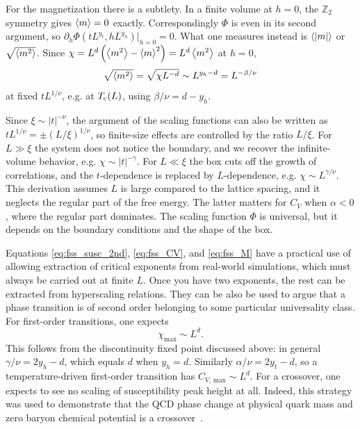 For the magnetization there is a subtlety. In a finite volume at $h=0$, the
$\mathbb{Z}_2$ symmetry gives $\ev{m}=0$ exactly. Correspondingly $\Phi$ is even
in its second argument, so
$\partial_h\Phi\left(tL^{y_t},hL^{y_h}\right)\big|_{h=0}=0$. What one measures
instead is $\ev{|m|}$ or $\sqrt{\ev{m^2}}$. Since
$\chi=L^d\left(\ev{m^2}-\ev{m}^2\right)=L^d\ev{m^2}$ at $h=0$,
\begin{equation}\label{eq:fss_M}
  \sqrt{\ev{m^2}}=\sqrt{\chi L^{-d}}\sim L^{y_h-d}=L^{-\beta/\nu}
\end{equation}
at fixed $tL^{1/\nu}$, e.g. at $T_{\rm c}(L)$, using $\beta/\nu=d-y_h$.

Since $\xi\sim|t|^{-\nu}$, the argument of the scaling functions can also be
written as $tL^{1/\nu}=\pm(L/\xi)^{1/\nu}$, so finite-size effects are
controlled by the ratio $L/\xi$. For $L\gg\xi$ the system does not notice the
boundary, and we recover the infinite-volume behavior, e.g.
$\chi\sim|t|^{-\gamma}$. For $L\ll\xi$ the box cuts off the growth of
correlations, and the $t$-dependence is replaced by $L$-dependence, e.g.
$\chi\sim L^{\gamma/\nu}$. This derivation assumes $L$ is large compared to the
lattice spacing, and it neglects the regular part of the free energy. The latter
matters for $C_V$ when $\alpha<0$, where the regular part dominates. The scaling
function $\Phi$ is universal, but it depends on the boundary conditions and the
shape of the box.


Equations \eqref{eq:fss_susc_2nd}, \eqref{eq:fss_CV}, and \eqref{eq:fss_M} 
have a practical use of
allowing extraction of critical exponents from real-world simulations,
which must always be carried out at finite $L$.
Once you have two exponents, the rest can be extracted from hyperscaling relations.
They can be also be used to argue that a phase transition is of second order
belonging to some particular universality class. For first-order transitions,
one expects~\cite{fisher_scaling_1982}
\begin{equation}\label{eq:fss_susc_1st}
    \chi_{\text{max}}\sim L^d.
\end{equation}
This follows from the discontinuity fixed point discussed above: in general
$\gamma/\nu=2y_h-d$, which equals $d$ when $y_h=d$. Similarly $\alpha/\nu=2y_t-d$,
so a temperature-driven first-order transition has $C_{V,\,\text{max}}\sim L^d$.
For a crossover, one expects to see no scaling of susceptibility peak height
at all. Indeed, this strategy was used to demonstrate that the QCD phase change
at physical quark mass and zero baryon chemical potential 
is a crossover~\cite{aoki_order_2006}.


